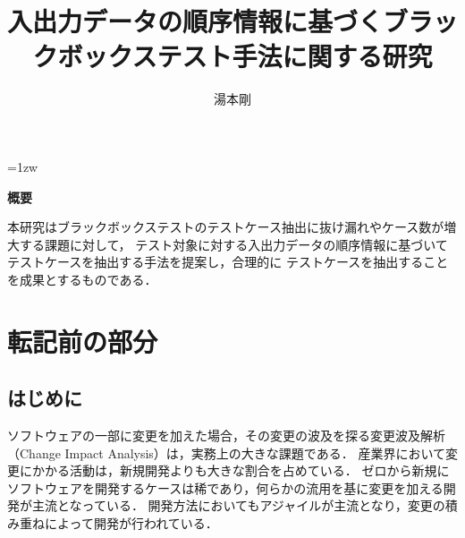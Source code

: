 \documentclass[a4paper,12pt]{jreport}
\title{入出力データの順序情報に基づくブラックボックステスト手法に関する研究}
\author{湯本剛}
\begin{document}
\maketitle
\thispagestyle{empty}
\newpage

\thispagestyle{empty}
\vspace*{20pt plus 1fil}
\parindent=1zw
\noindent
\begin{center}
{\bf 概要}
\vspace{5mm}
\end{center}
本研究はブラックボックステストのテストケース抽出に抜け漏れやケース数が増大する課題に対して，
テスト対象に対する入出力データの順序情報に基づいてテストケースを抽出する手法を提案し，合理的に
テストケースを抽出することを成果とするものである．


\par
\vspace{0pt plus 1fil}
\newpage

\tableofcontents
\listoffigures

\pagebreak \setcounter{page}{1}











\chapter{転記前の部分}
\cite{IEEE610.12-90}
\cite{yumoto2006}
\cite{013}
\cite{Ostrand:1988:CMS:62959.62964}
\cite{Grindal:2007:IPM:1332044.1332085}
\cite{takagi2010concurrent}
\cite{eldh2011analysis}
\section{はじめに}
ソフトウェアの一部に変更を加えた場合，その変更の波及を探る変更波及解析（Change Impact Analysis）は，実務上の大きな課題である．
産業界において変更にかかる活動は，新規開発よりも大きな割合を占めている．
ゼロから新規にソフトウェアを開発するケースは稀であり，何らかの流用を基に変更を加える開発が主流となっている．
開発方法においてもアジャイルが主流となり，変更の積み重ねによって開発が行われている．
\end{document}

